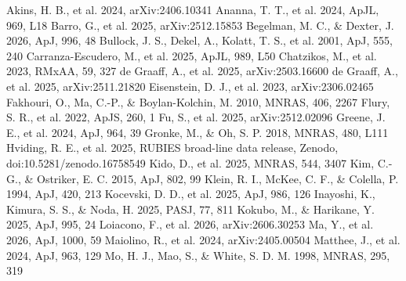 \documentclass[twocolumn]{aastex631}
\begin{document}
\begin{thebibliography}{}
 Akins, H. B., et al. 2024,
arXiv:2406.10341
 Ananna, T. T., et al. 2024,
ApJL, 969, L18
 Barro, G., et al. 2025,
arXiv:2512.15853
 Begelman, M. C., \&
Dexter, J. 2026, ApJ, 996, 48
 Bullock, J. S., Dekel, A.,
Kolatt, T. S., et al. 2001, ApJ, 555, 240
 Carranza-Escudero,
M., et al. 2025, ApJL, 989, L50
 Chatzikos, M., et al.
2023, RMxAA, 59, 327
 de Graaff, A., et al.
2025, arXiv:2503.16600
 de Graaff, A., et al.
2025, arXiv:2511.21820
 Eisenstein, D. J., et
al. 2023, arXiv:2306.02465
 Fakhouri, O., Ma, C.-P., \&
Boylan-Kolchin, M. 2010, MNRAS, 406, 2267
 Flury, S. R., et al. 2022, ApJS,
260, 1
 Fu, S., et al. 2025, arXiv:2512.02096
 Greene, J. E., et al. 2024,
ApJ, 964, 39
 Gronke, M., \& Oh, S. P. 2018,
MNRAS, 480, L111
 Hviding, R. E., et al. 2025,
RUBIES broad-line data release, Zenodo, doi:10.5281/zenodo.16758549
 Kido, D., et al. 2025, MNRAS, 544,
3407
 Kim, C.-G., \& Ostriker,
E. C. 2015, ApJ, 802, 99
 Klein, R. I., McKee, C. F., \&
Colella, P. 1994, ApJ, 420, 213
 Kocevski, D. D., et al.
2025, ApJ, 986, 126
 Inayoshi, K., Kimura, S. S.,
\& Noda, H. 2025, PASJ, 77, 811
 Kokubo, M., \&
Harikane, Y. 2025, ApJ, 995, 24
 Loiacono, F., et al. 2026,
arXiv:2606.30253
 Ma, Y., et al. 2026, ApJ, 1000, 59
 Maiolino, R., et al. 2024,
arXiv:2405.00504
 Matthee, J., et al. 2024,
ApJ, 963, 129
 Mo, H. J., Mao, S., \& White, S. D. M.
1998, MNRAS, 295, 319

\end{thebibliography}
\end{document}
